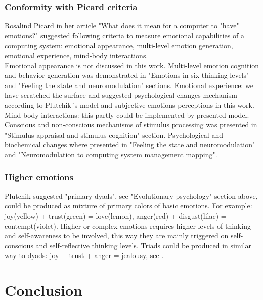\subsubsection{Conformity with Picard criteria}

Rosalind Picard in her article "What does it mean for a computer to "have" emotions?"\cite{whatdoesitmeanforcomputer} suggested following criteria to measure emotional capabilities of a computing system: emotional appearance, multi-level emotion generation, emotional experience, mind-body interactions.\\
Emotional appearance is not discussed in this work. Multi-level emotion cognition and behavior generation was demonstrated in "Emotions in six thinking levels" and "Feeling the state and neuromodulation" sections. Emotional experience: we have scratched the surface and suggested psychological changes mechanism according to Plutchik´s model and subjective emotions perceptions in this work. Mind-body interactions: this partly could be implemented by presented model. Conscious and non-conscious mechanisms of stimulus processing was presented in "Stimulus appraisal and stimulus cognition" section. Psychological and biochemical changes where presented in "Feeling the state and neuromodulation" and "Neuromodulation to computing system management mapping".

\subsubsection{Higher emotions}

Plutchik\cite{natureofemotions} suggested "primary dyads", see "Evolutionary psychology" section above, could be produced as mixture of primary colors of basic emotions. For example: joy(yellow) + trust(green) = love(lemon), anger(red) + disgust(lilac) = contempt(violet). Higher or complex emotions requires higher levels of thinking and self-awareness to be involved, this way they are mainly triggered on self-conscious and self-reflective thinking levels. Triads could be produced in similar way to dyads: joy + trust + anger = jealousy, see \cite{senticcomputing}.

\section{Conclusion}

